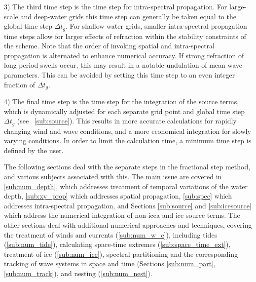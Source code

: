 \begin{list}{xx}{\itemsep 0mm \parsep 0mm \rightmargin 5mm}
\item[3)] The third time step is the time step for intra-spectral
propagation. For large-scale and deep-water grids this time step can generally
be taken equal to the global time step $\Delta t_g$. For shallow water grids,
smaller intra-spectral propagation time steps allow for larger effects of
refraction within the stability constraints of the scheme. Note that the order
of invoking spatial and intra-spectral propagation is alternated to enhance
numerical accuracy. If strong refraction of long period swells occur, this may
result in a notable undulation of mean wave parameters. This can be avoided by
setting this time step to an even integer fraction of $\Delta t_g$.

\item[4)] The final time step is the time step for the integration of the
source terms, which is dynamically adjusted for each separate grid point and
global time step $\Delta t_g$ (see \para~\ref{sub:source}). This results in
more accurate calculations for rapidly changing wind and wave conditions, and
a more economical integration for slowly varying conditions. In order to limit the 
calculation time, a minimum time step is defined by the user. 

\end{list}

\vspace{\baselineskip} \noindent 

The following sections deal with the separate steps in the fractional step
method, and various subjects associated with this.  The main issue are covered
in \para\ref{sub:num_depth}, which addresses treatment of temporal variations
of the water depth, \para\ref{sub:xy_prop} which addresses spatial
propagation, \para\ref{sub:spec} which addresses intra-spectral propagation,
and Sections \ref{sub:source} and \ref{sub:icesource} which address the numerical 
integration of non-icea and ice source
terms.  The other sections deal with additional
numerical approaches and techniques, covering the treatment of winds and
currents (\para\ref{sub:num_w_c}), including tides (\para\ref{sub:num_tide}), calculating space-time extremes (\para\ref{sub:space_time_ext}), treatment
of ice (\para\ref{sub:num_ice}), spectral partitioning and the corresponding
tracking of wave systems in space and time (Sections \ref{sub:num_part},
\ref{sub:num_track}), and nesting (\para\ref{sub:num_nest}).
